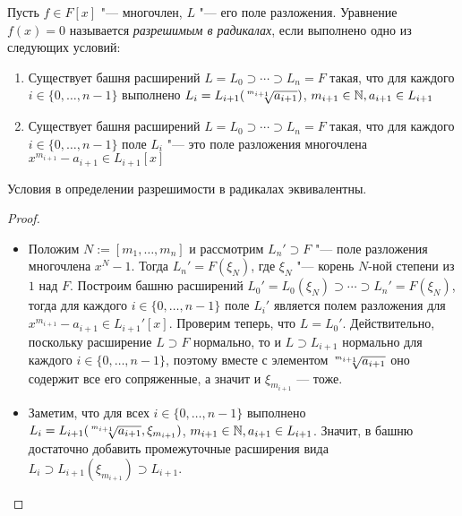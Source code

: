 \begin{definition}
	Пусть $f \in F[x]$ "--- многочлен, $L$ "--- его поле разложения. Уравнение $f(x) = 0$ называется \textit{разрешимым в радикалах}, если выполнено одно из следующих условий:
	\begin{enumerate}
		\item Существует башня расширений $L = L_0 \supset \dotsb \supset L_n = F$ такая, что для каждого $i \in \{0, \dotsc, n - 1\}$ выполнено $L_{i} = L_{i + 1}(\sqrt[\leftroot{2}\uproot{4}m_{i + 1}]{a_{i + 1}})$, $m_{i + 1} \in \mathbb{N}, a_{i + 1} \in L_{i + 1}$
		\item Существует башня расширений $L = L_0 \supset \dotsb \supset L_n = F$ такая, что для каждого $i \in \{0, \dotsc, n - 1\}$ поле $L_{i}$ "--- это поле разложения многочлена $x^{m_{i + 1}} - a_{i + 1} \in L_{i + 1}[x]$
	\end{enumerate}
\end{definition}

\begin{proposition}
	Условия в определении разрешимости в радикалах эквивалентны.
\end{proposition}

\begin{proof}~
	\begin{itemize}
		\item{}Положим $N := [m_1, \dotsc, m_n]$ и рассмотрим $L_n' \supset F$ "--- поле разложения многочлена $x^N - 1$. Тогда $L_n' = F(\xi_N)$, где $\xi_N$ "--- корень $N$-ной степени из $1$ над $F$. Построим башню расширений $L_0' = L_0(\xi_N) \supset \dotsb \supset L_n' = F(\xi_N)$, тогда для каждого $i \in \{0, \dotsc, n - 1\}$ поле $L_{i}'$ является полем разложения для $x^{m_{i+1}} - a_{i+1} \in L_{i+1}'[x]$. Проверим теперь, что $L = L_0'$. Действительно, поскольку расширение $L \supset F$ нормально, то и $L \supset L_{i+1}$ нормально для каждого $i \in \{0, \dotsc, n-1\}$, поэтому вместе с элементом $\sqrt[\leftroot{2}\uproot{4}m_{i + 1}]{a_{i + 1}}$ оно содержит все его сопряженные, а значит и $\xi_{m_{i+1}}$ --- тоже.
		
		\item{}Заметим, что для всех $i \in \{0, \dotsc, n - 1\}$ выполнено $L_{i} = L_{i+1}(\sqrt[\leftroot{2}\uproot{4}m_{i+1}]{a_{i+1}}, \xi_{m_{i + 1}})$, $m_{i+1} \in \mathbb{N}, a_{i+1} \in L_{i+1}$. Значит, в башню достаточно добавить промежуточные расширения вида $L_{i} \supset L_{i + 1}(\xi_{m_{i + 1}}) \supset L_{i + 1}$.\qedhere
	\end{itemize}
\end{proof}

